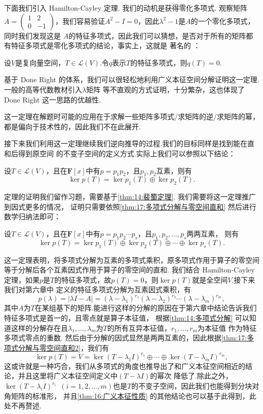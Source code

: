 下面我们引入 Hamilton-Cayley 定理. 我们的动机是获得零化多项式. 观察矩阵$A=\begin{pmatrix}
    1 & 2 \\ 0 & -1
\end{pmatrix}$，我们容易验证$A^2-I=0$，因此$\lambda^2-1$是$A$的一个零化多项式，同时我们发现这是
$A$的特征多项式，因此我们可以猜想，是否对于所有的矩阵都有特征多项式是零化多项式的结论，事实上，这就是
著名的 ：
\begin{theorem} \label{thm:17:HC}
    设$V$是复向量空间，$T\in \mathcal{L}(V)$.令$q$表示$T$的特征多项式，则$q(T)=0$.
\end{theorem}
基于 Done Right 的体系，我们可以很轻松地利用广义本征空间分解证明这一定理.一般的高等代数教材引入$\lambda$矩阵
等不直观的方式证明，十分繁杂，这也体现了 Done Right 这一思路的优越性.

这一定理在解题时可能的应用在于求解一些矩阵多项式/求矩阵的逆/求矩阵的幂，都是偏向于技术性的，因此我们不在此展开.

接下来我们利用这一定理继续我们逆向推导的过程.我们的目标同样是找到能在直和后得到原空间
的不变子空间的定义方式.实际上我们可以参照以下结论：
\begin{theorem} \label{thm:17:多项式分解与零空间直和}
    设$T\in \mathcal{L}(V)$，且在$\mathbf{F}[x]$中有$p=p_1p_2$，且$p_1,p_2$互素，则有
    \[\ker p(T)=\ker p_1(T)\oplus\ker p_2(T).\]
\end{theorem}
定理的证明我们留作习题，需要基于\autoref{thm:14:裴蜀定理}. 我们需要将这一定理推广到因式更多的情况，
证明只需要依照\autoref{thm:17:多项式分解与零空间直和} 然后进行数学归纳法即可：
\begin{theorem} \label{thm:17:多项式分解与零空间直和2}
    设$T\in \mathcal{L}(V)$，且在$\mathbf{F}[x]$中有$p=p_1p_2\cdots p_s$，且$p_1,p_2,\ldots,p_s$两两互素，
    则有\[\ker p(T)=\ker p_1(T)\oplus\ker p_2(T)\oplus\cdots\oplus\ker p_s(T).\]
\end{theorem}
这一定理表明，将多项式分解为互素的多项式乘积，原多项式作用于算子的零空间等于分解后各个互素因式作用于算子的零空间的直和.
我们结合 Hamilton-Cayley 定理，如果$p$是$T$的特征多项式，故$p(T)=0$，则$\ker p(T)$就是全空间$V$.接下来我们对第六章中
定义的特征多项式分解为互素因式乘积，有
\[p(\lambda)=|\lambda I-A|=(\lambda-\lambda_1)^{r_1}(\lambda-\lambda_2)^{r_2}\cdots(\lambda-\lambda_m)^{r_m},\]
其中$A$为$T$在某组基下的矩阵.能进行这样的分解的原因在于第六章中结论告诉我们特征多项式是首一的，且零点就是算子本征值，
根据\autoref{thm:14:多项式分解} 可以知道这样的分解存在且$\lambda_1,\ldots,\lambda_m$为$T$的所有互异本征值，$r_1,\ldots,r_m$为本征值
作为特征多项式零点的重数. 然后由于分解的因式显然是两两互素的，因此根据\autoref{thm:17:多项式分解与零空间直和2}，我们有
\[\ker p(T)=V=\ker (T-\lambda_1I)^{r_1}\oplus\cdots\oplus\ker (T-\lambda_mI)^{r_m},\]
这或许就是一种巧合，我们从多项式的角度也推导出了和广义本征空间相近的结论，并且这里将广义本征空间定义中$(T-\lambda I)$的幂次
降低了.除此之外，$\ker (T-\lambda_iI)^{r_i}\enspace(i=1,2,\ldots,m)$也是$T$的不变子空间，因此我们也能得到分块对角矩阵的标准形，
并且\autoref{thm:16:广义本征性质} 的其他结论也可以基于此得到，此处不再赘述.

